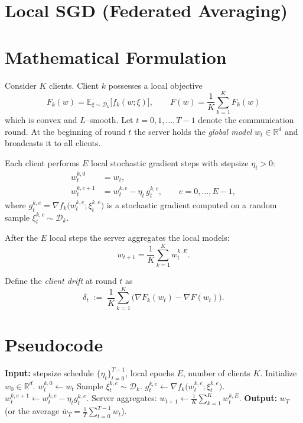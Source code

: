 \documentclass[11pt]{article}
\newcommand{\E}{\mathbb{E}}
\newcommand{\R}{\mathbb{R}}
\begin{document}
\section*{Local SGD (Federated Averaging)}

\section*{Mathematical Formulation}
Consider $K$ clients.  Client $k$ possesses a local objective  
\[
F_k(w)=\E_{\xi\sim\mathcal{D}_k}\big[f_k(w;\xi)\big],
\qquad 
F(w)=\frac1K\sum_{k=1}^K F_k(w)
\]
which is convex and $L$–smooth.  
Let $t=0,1,\dots,T-1$ denote the communication round.  
At the beginning of round $t$ the server holds the \emph{global model} $w_t\in\R^d$ and broadcasts it to all clients.

Each client performs $E$ local stochastic gradient steps with stepsize $\eta_t>0$:
\[
\begin{aligned}
w_{t}^{k,0}&=w_t,\\
w_{t}^{k,e+1}&=w_{t}^{k,e}-\eta_t\,g_{t}^{k,e},
\qquad e=0,\dots,E-1,
\end{aligned}
\tag{1}
\]
where $g_{t}^{k,e}= \nabla f_k\big(w_{t}^{k,e};\xi_{t}^{k,e}\big)$ is a stochastic gradient computed on a random sample $\xi_{t}^{k,e}\sim\mathcal{D}_k$.

After the $E$ local steps the server aggregates the local models:
\[
w_{t+1}= \frac1K\sum_{k=1}^K w_{t}^{k,E}.
\tag{2}
\]

Define the \emph{client drift} at round $t$ as
\[
\delta_t \;:=\; \frac1K\sum_{k=1}^K\big(\nabla F_k(w_t)-\nabla F(w_t)\big).
\tag{3}
\]

\section*{Pseudocode}
\begin{algorithm}[H]
\caption{Local SGD (Federated Averaging)}
\begin{algorithmic}[1]
\STATE \textbf{Input:} stepsize schedule $\{\eta_t\}_{t=0}^{T-1}$, local epochs $E$, number of clients $K$.
\STATE Initialize $w_0\in\R^d$.
        \STATE $w_{t}^{k,0}\gets w_t$
            \STATE Sample $\xi_{t}^{k,e}\sim\mathcal{D}_k$.
            \STATE $g_{t}^{k,e}\gets \nabla f_k\big(w_{t}^{k,e};\xi_{t}^{k,e}\big)$.
            \STATE $w_{t}^{k,e+1}\gets w_{t}^{k,e}-\eta_t g_{t}^{k,e}$.
        \ENDFOR
    \ENDFOR
    \STATE Server aggregates: $w_{t+1}\gets \frac1K\sum_{k=1}^K w_{t}^{k,E}$.
\ENDFOR
\STATE \textbf{Output:} $w_T$ (or the average $\bar w_T=\frac1T\sum_{t=0}^{T-1}w_t$).
\end{algorithmic}
\end{algorithm}
\end{document}
